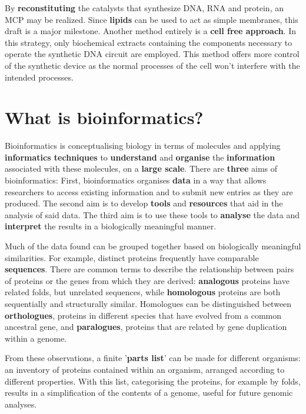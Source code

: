 \documentclass[10pt,a4paper]{report}
\begin{document}
	By \textbf{reconstituting} the catalysts that synthesize DNA, RNA and protein, an MCP may be realized. 
	Since \textbf{lipids} can be used to act as simple membranes, this draft is a major milestone.
	Another method entirely is a \textbf{cell free approach}. 
	In this strategy, only biochemical extracts containing the components necessary to operate the synthetic DNA circuit are employed. 
	This method offers more control of the synthetic device as the normal processes of the cell won’t interfere with the intended processes.
	
	\newpage
	\section{What is bioinformatics?}
	
	Bioinformatics is conceptualising biology in terms of molecules and applying \textbf{informatics techniques} to \textbf{understand} and \textbf{organise} the \textbf{information} associated with these molecules, on a \textbf{large scale}. There are \textbf{three} aims of bioinformatics: First, bioinformatics organises \textbf{data} in a way that allows researchers to access existing information and to submit new entries as they are produced. The second aim is to develop \textbf{tools} and \textbf{resources} that aid in the analysis of said data. The third aim is to use these tools to \textbf{analyse} the data and \textbf{interpret} the results in a biologically meaningful manner.
	
	Much of the data found can be grouped together based on biologically meaningful similarities. For example, distinct proteins frequently have comparable \textbf{sequences}. There are common terms to describe the relationship between pairs of proteins or the genes from which they are derived: \textbf{analogous} proteins have related folds, but unrelated sequences, while \textbf{homologous} proteins are both sequentially and structurally similar. Homologues can be distinguished between \textbf{orthologues}, proteins in different species that have evolved from a common ancestral gene, and \textbf{paralogues}, proteins that are related by gene duplication within a genome. 
	
	From these observations, a finite '\textbf{parts list}' can be made for different organisms: an inventory of proteins contained within an organism, arranged according to different properties. With this list, categorising the proteins, for example by folds, results in a simplification of the contents of a genome, useful for future genomic analyses. 
	
\end{document}

